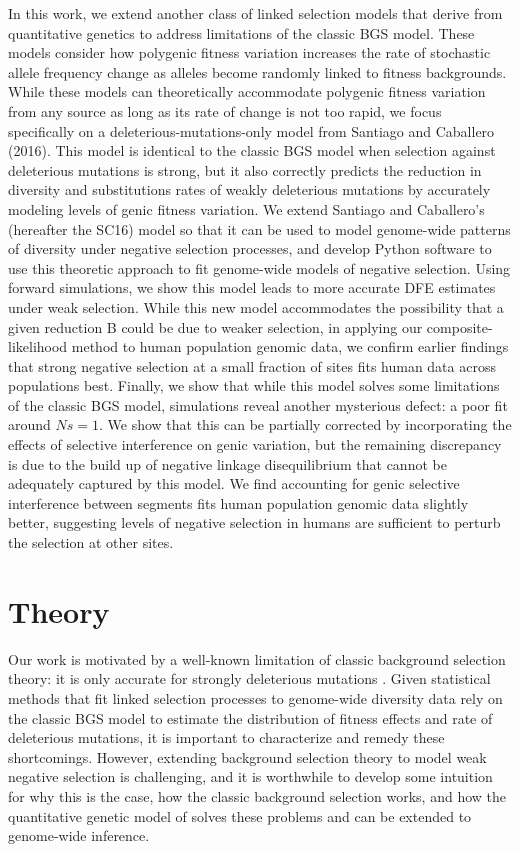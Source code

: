 \documentclass[11pt]{article}
\begin{document}
In this work, we extend another class of linked selection models that derive
from quantitative genetics to address limitations of the classic BGS model.
These models consider how polygenic fitness variation increases the rate of
stochastic allele frequency change as alleles become randomly linked to fitness
backgrounds. While these models can theoretically accommodate polygenic fitness
variation from any source as long as its rate of change is not too rapid, we
focus specifically on a deleterious-mutations-only model from Santiago and
Caballero (2016). This model is identical to the classic BGS model when
selection against deleterious mutations is strong, but it also correctly
predicts the reduction in diversity and substitutions rates of weakly
deleterious mutations by accurately modeling levels of genic fitness variation.
We extend Santiago and Caballero’s (hereafter the SC16) model so that it can be
used to model genome-wide patterns of diversity under negative selection
processes, and develop Python software to use this theoretic approach to fit
genome-wide models of negative selection. Using forward simulations, we show
this model leads to more accurate DFE estimates under weak selection. While
this new model accommodates the possibility that a given reduction B could be
due to weaker selection, in applying our composite-likelihood method to human
population genomic data, we confirm earlier findings that strong negative
selection at a small fraction of sites fits human data across populations best.
Finally, we show that while this model solves some limitations of the classic
BGS model, simulations reveal another mysterious defect: a poor fit around
$Ns=1$. We show that this can be partially corrected by incorporating the
effects of selective interference on genic variation, but the remaining
discrepancy is due to the build up of negative linkage disequilibrium that
cannot be adequately captured by this model. We find accounting for genic
selective interference between segments fits human population genomic data
slightly better, suggesting levels of negative selection in humans are
sufficient to perturb the selection at other sites.

\section*{Theory}

Our work is motivated by a well-known limitation of classic background
selection theory: it is only accurate for strongly deleterious mutations
\parencite{Charlesworth1993-gb,McVean2000-bt,Good2013-lp,Gordo2002-dr}. Given
statistical methods that fit linked selection processes to genome-wide
diversity data rely on the classic BGS model to estimate the distribution of
fitness effects and rate of deleterious mutations, it is important to
characterize and remedy these shortcomings. However, extending background
selection theory to model weak negative selection is challenging, and it is
worthwhile to develop some intuition for why this is the case, how the classic
background selection works, and how the quantitative genetic model of
\textcite{Santiago2016-mu} solves these problems and can be extended to
genome-wide inference.
\end{document}
